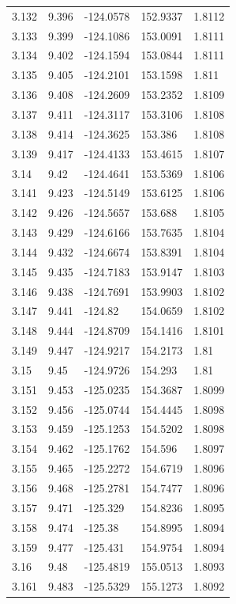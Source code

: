 \begin{tabular}{lllll}
3.132 & 9.396 & -124.0578 & 152.9337 & 1.8112 \\
3.133 & 9.399 & -124.1086 & 153.0091 & 1.8111 \\
3.134 & 9.402 & -124.1594 & 153.0844 & 1.8111 \\
3.135 & 9.405 & -124.2101 & 153.1598 & 1.811 \\
3.136 & 9.408 & -124.2609 & 153.2352 & 1.8109 \\
3.137 & 9.411 & -124.3117 & 153.3106 & 1.8108 \\
3.138 & 9.414 & -124.3625 & 153.386 & 1.8108 \\
3.139 & 9.417 & -124.4133 & 153.4615 & 1.8107 \\
3.14 & 9.42 & -124.4641 & 153.5369 & 1.8106 \\
3.141 & 9.423 & -124.5149 & 153.6125 & 1.8106 \\
3.142 & 9.426 & -124.5657 & 153.688 & 1.8105 \\
3.143 & 9.429 & -124.6166 & 153.7635 & 1.8104 \\
3.144 & 9.432 & -124.6674 & 153.8391 & 1.8104 \\
3.145 & 9.435 & -124.7183 & 153.9147 & 1.8103 \\
3.146 & 9.438 & -124.7691 & 153.9903 & 1.8102 \\
3.147 & 9.441 & -124.82 & 154.0659 & 1.8102 \\
3.148 & 9.444 & -124.8709 & 154.1416 & 1.8101 \\
3.149 & 9.447 & -124.9217 & 154.2173 & 1.81 \\
3.15 & 9.45 & -124.9726 & 154.293 & 1.81 \\
3.151 & 9.453 & -125.0235 & 154.3687 & 1.8099 \\
3.152 & 9.456 & -125.0744 & 154.4445 & 1.8098 \\
3.153 & 9.459 & -125.1253 & 154.5202 & 1.8098 \\
3.154 & 9.462 & -125.1762 & 154.596 & 1.8097 \\
3.155 & 9.465 & -125.2272 & 154.6719 & 1.8096 \\
3.156 & 9.468 & -125.2781 & 154.7477 & 1.8096 \\
3.157 & 9.471 & -125.329 & 154.8236 & 1.8095 \\
3.158 & 9.474 & -125.38 & 154.8995 & 1.8094 \\
3.159 & 9.477 & -125.431 & 154.9754 & 1.8094 \\
3.16 & 9.48 & -125.4819 & 155.0513 & 1.8093 \\
3.161 & 9.483 & -125.5329 & 155.1273 & 1.8092 \\

\end{tabular}
